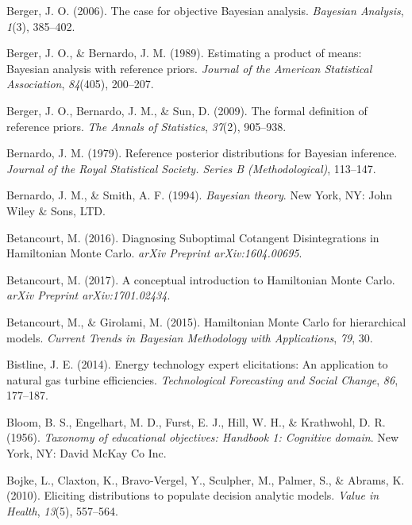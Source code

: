 \documentclass[openright,titlepage,12pt,a4paper]{book}
\begin{document}
\leavevmode\hypertarget{ref-berger_case_2006}{}%
Berger, J. O. (2006). The case for objective Bayesian analysis. \emph{Bayesian Analysis}, \emph{1}(3), 385--402.

\leavevmode\hypertarget{ref-berger_estimating_1989}{}%
Berger, J. O., \& Bernardo, J. M. (1989). Estimating a product of means: Bayesian analysis with reference priors. \emph{Journal of the American Statistical Association}, \emph{84}(405), 200--207.

\leavevmode\hypertarget{ref-berger_formal_2009}{}%
Berger, J. O., Bernardo, J. M., \& Sun, D. (2009). The formal definition of reference priors. \emph{The Annals of Statistics}, \emph{37}(2), 905--938.

\leavevmode\hypertarget{ref-bernardo_reference_1979}{}%
Bernardo, J. M. (1979). Reference posterior distributions for Bayesian inference. \emph{Journal of the Royal Statistical Society. Series B (Methodological)}, 113--147.

\leavevmode\hypertarget{ref-bernardo_bayesian_1994}{}%
Bernardo, J. M., \& Smith, A. F. (1994). \emph{Bayesian theory}. New York, NY: John Wiley \& Sons, LTD.

\leavevmode\hypertarget{ref-betancourt_diagnosing_2016}{}%
Betancourt, M. (2016). Diagnosing Suboptimal Cotangent Disintegrations in Hamiltonian Monte Carlo. \emph{arXiv Preprint arXiv:1604.00695}.

\leavevmode\hypertarget{ref-betancourt_conceptual_2017}{}%
Betancourt, M. (2017). A conceptual introduction to Hamiltonian Monte Carlo. \emph{arXiv Preprint arXiv:1701.02434}.

\leavevmode\hypertarget{ref-betancourt_hamiltonian_2015}{}%
Betancourt, M., \& Girolami, M. (2015). Hamiltonian Monte Carlo for hierarchical models. \emph{Current Trends in Bayesian Methodology with Applications}, \emph{79}, 30.

\leavevmode\hypertarget{ref-bistline_energy_2014}{}%
Bistline, J. E. (2014). Energy technology expert elicitations: An application to natural gas turbine efficiencies. \emph{Technological Forecasting and Social Change}, \emph{86}, 177--187.

\leavevmode\hypertarget{ref-bloom_taxonomy_1956}{}%
Bloom, B. S., Engelhart, M. D., Furst, E. J., Hill, W. H., \& Krathwohl, D. R. (1956). \emph{Taxonomy of educational objectives: Handbook 1: Cognitive domain}. New York, NY: David McKay Co Inc.

\leavevmode\hypertarget{ref-bojke_eliciting_2010}{}%
Bojke, L., Claxton, K., Bravo-Vergel, Y., Sculpher, M., Palmer, S., \& Abrams, K. (2010). Eliciting distributions to populate decision analytic models. \emph{Value in Health}, \emph{13}(5), 557--564.
\end{document}
